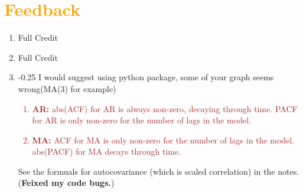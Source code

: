 \documentclass[11pt,en]{elegantpaper}
\begin{document}
\newpage
\section*{\textcolor{orange}{Feedback}}

\begin{enumerate}
    \item Full Credit
    \item Full Credit
    \item -0.25 I would suggest using python package, some of your graph seems wrong(MA(3) for example)
        \textcolor{brown}{ \begin{enumerate}
            \item \textbf{AR: } abs(ACF) for AR is always non-zero, decaying through time.  PACF for AR is only non-zero
            for the number of lags in the model.
            \item \textbf{MA: }ACF for MA is only non-zero for the number of lags in the model. abs(PACF) for MA decays through time.
        \end{enumerate}
        }
        See the formuals for autocovariance (which is scaled correlation) in the notes.(\textbf{Feixed my code bugs.})
\end{enumerate}
\end{document}
